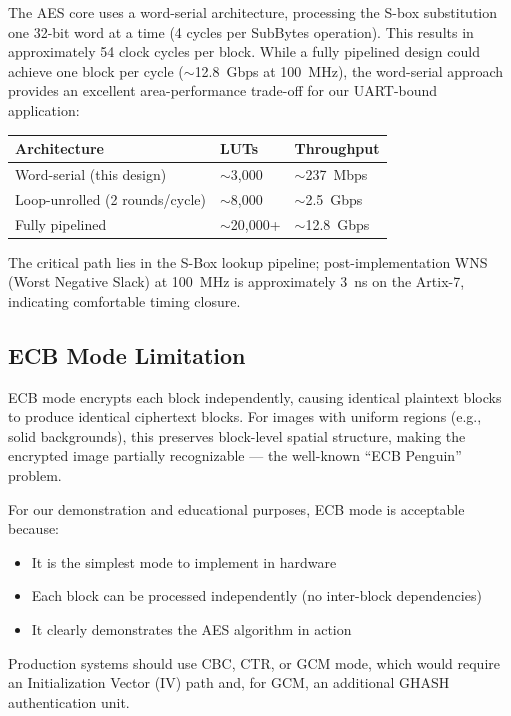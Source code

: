 \documentclass[12pt,a4paper]{article}
\begin{document}
The AES core uses a word-serial architecture, processing the S-box substitution one 32-bit word at a time (4 cycles per SubBytes operation). This results in approximately 54 clock cycles per block. While a fully pipelined design could achieve one block per cycle ($\sim$12.8~Gbps at 100~MHz), the word-serial approach provides an excellent area-performance trade-off for our UART-bound application:

\begin{center}\small
\begin{tabular}{lll}\toprule
\textbf{Architecture} & \textbf{LUTs} & \textbf{Throughput} \\ \midrule
Word-serial (this design) & $\sim$3,000 & $\sim$237~Mbps \\
Loop-unrolled (2 rounds/cycle) & $\sim$8,000 & $\sim$2.5~Gbps \\
Fully pipelined & $\sim$20,000+ & $\sim$12.8~Gbps \\
\bottomrule
\end{tabular}
\end{center}

The critical path lies in the S-Box lookup pipeline; post-implementation WNS (Worst Negative Slack) at 100~MHz is approximately 3~ns on the Artix-7, indicating comfortable timing closure.

\subsection{ECB Mode Limitation}

ECB mode encrypts each block independently, causing identical plaintext blocks to produce identical ciphertext blocks. For images with uniform regions (e.g., solid backgrounds), this preserves block-level spatial structure, making the encrypted image partially recognizable — the well-known ``ECB Penguin'' problem.

For our demonstration and educational purposes, ECB mode is acceptable because:
\begin{itemize}
    \item It is the simplest mode to implement in hardware
    \item Each block can be processed independently (no inter-block dependencies)
    \item It clearly demonstrates the AES algorithm in action
\end{itemize}

Production systems should use CBC, CTR, or GCM mode, which would require an Initialization Vector (IV) path and, for GCM, an additional GHASH authentication unit.
\end{document}
